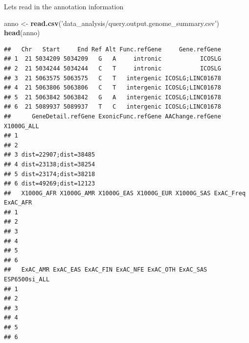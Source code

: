 \documentclass[
]{article}
\newenvironment{Shaded}{\begin{snugshade}}{\end{snugshade}}
\newcommand{\KeywordTok}[1]{\textcolor[rgb]{0.13,0.29,0.53}{\textbf{#1}}}
\newcommand{\NormalTok}[1]{#1}
\newcommand{\StringTok}[1]{\textcolor[rgb]{0.31,0.60,0.02}{#1}}
\begin{document}
Lets read in the annotation information

\begin{Shaded}
\begin{Highlighting}[]
\NormalTok{anno <-}\StringTok{ }\KeywordTok{read.csv}\NormalTok{(}\StringTok{'data_analysis/query.output.genome_summary.csv'}\NormalTok{)}
\KeywordTok{head}\NormalTok{(anno)}
\end{Highlighting}
\end{Shaded}

\begin{verbatim}
##   Chr   Start     End Ref Alt Func.refGene     Gene.refGene
## 1  21 5034209 5034209   G   A     intronic           ICOSLG
## 2  21 5034244 5034244   C   T     intronic           ICOSLG
## 3  21 5063575 5063575   C   T   intergenic ICOSLG;LINC01678
## 4  21 5063806 5063806   C   T   intergenic ICOSLG;LINC01678
## 5  21 5063842 5063842   G   A   intergenic ICOSLG;LINC01678
## 6  21 5089937 5089937   T   C   intergenic ICOSLG;LINC01678
##      GeneDetail.refGene ExonicFunc.refGene AAChange.refGene X1000G_ALL
## 1                                                                     
## 2                                                                     
## 3 dist=22907;dist=38485                                               
## 4 dist=23138;dist=38254                                               
## 5 dist=23174;dist=38218                                               
## 6 dist=49269;dist=12123                                               
##   X1000G_AFR X1000G_AMR X1000G_EAS X1000G_EUR X1000G_SAS ExAC_Freq ExAC_AFR
## 1                                                                          
## 2                                                                          
## 3                                                                          
## 4                                                                          
## 5                                                                          
## 6                                                                          
##   ExAC_AMR ExAC_EAS ExAC_FIN ExAC_NFE ExAC_OTH ExAC_SAS ESP6500si_ALL
## 1                                                                    
## 2                                                                    
## 3                                                                    
## 4                                                                    
## 5                                                                    
## 6                                                                    

\end{verbatim}
\end{document}
